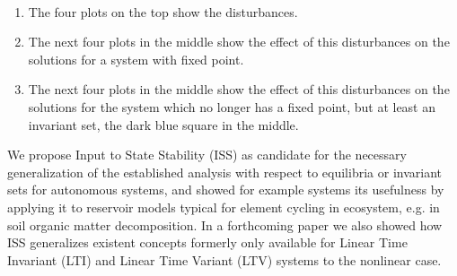 \begin{minipage}[height=\columnheight]{\textwidth}
\begin{multicols*}{3}
\\
\begin{enumerate}
	\item
	The four plots on the top show the disturbances.
	\item
	The next four plots in the middle show the effect of this disturbances on the solutions for a system with fixed point. 
	\item
	The next four plots in the middle show the effect of this disturbances on the solutions for the system which no longer has a fixed point, but at least an invariant set, the dark blue square in the middle.
\end{enumerate}
\noindent
We propose Input to State Stability (ISS) as
candidate for the necessary generalization of the established analysis with
respect to equilibria or invariant sets for autonomous systems, and showed for example systems its
usefulness by applying it to reservoir models typical for element cycling in
ecosystem, e.g. in soil organic matter decomposition.  In a forthcoming paper we  also showed how ISS
generalizes existent concepts formerly only available for Linear Time Invariant
(LTI) and Linear Time Variant (LTV) systems to the nonlinear case. 



\end{multicols*}
\end{minipage}
